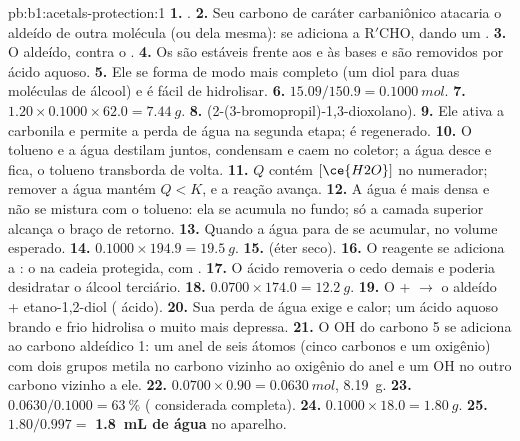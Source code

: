 \begin{solution}{pb:b1:acetals-protection:1}
\textbf{1.} .
\textbf{2.} Seu carbono de caráter carbaniônico atacaria o aldeído de
outra molécula (ou dela mesma):  se adiciona a $\mathrm{R'CHO}$, dando um .
\textbf{3.} O aldeído, contra o .
\textbf{4.} Os  são estáveis frente aos  e às
bases e são removidos por ácido aquoso.
\textbf{5.} Ele se forma de modo mais completo (um diol para duas
moléculas de álcool) e é fácil de hidrolisar.
\textbf{6.} $15.09/150.9 = \qty{0.1000}{mol}$.
\textbf{7.} $1.20 \times 0.1000 \times 62.0 = \qty{7.44}{g}$.
\textbf{8.} 
(2-(3-bromopropil)-1,3-dioxolano).
\textbf{9.} Ele ativa a carbonila e permite a perda de água na segunda
etapa; é regenerado.
\textbf{10.} O tolueno e a água destilam juntos, condensam e caem no
coletor; a água desce e fica, o tolueno transborda de volta.
\textbf{11.} $Q$ contém $[\ce{H2O}]$ no numerador; remover a água mantém
$Q < K$, e a reação avança.
\textbf{12.} A água é mais densa e não se mistura com o tolueno: ela se
acumula no fundo; só a camada superior alcança o braço de retorno.
\textbf{13.} Quando a água para de se acumular, no volume esperado.
\textbf{14.} $0.1000 \times 194.9 = \qty{19.5}{g}$.
\textbf{15.}  (éter seco).
\textbf{16.} O reagente se adiciona a : o 
 na cadeia protegida, com .
\textbf{17.} O ácido removeria o  cedo demais e poderia
desidratar o álcool terciário.
\textbf{18.} $0.0700 \times 174.0 = \qty{12.2}{g}$.
\textbf{19.} O  +  $\to$ o aldeído + etano-1,2-diol
( ácido).
\textbf{20.} Sua perda de água exige  e calor; um ácido aquoso
brando e frio hidrolisa o  muito mais depressa.
\textbf{21.} O OH do carbono 5 se adiciona ao carbono aldeídico 1: um anel
de seis átomos (cinco carbonos e um oxigênio) com dois grupos metila no
carbono vizinho ao oxigênio do anel e um OH no outro carbono vizinho a ele.
\textbf{22.} $0.0700 \times 0.90 = \qty{0.0630}{mol}$, \qty{8.19}{g}.
\textbf{23.} $0.0630/0.1000 = \qty{63}{\percent}$ ( considerada
completa).
\textbf{24.} $0.1000 \times 18.0 = \qty{1.80}{g}$.
\textbf{25.} $1.80/0.997 =$ \textbf{\qty{1.8}{mL} de água} no aparelho.
\end{solution}
